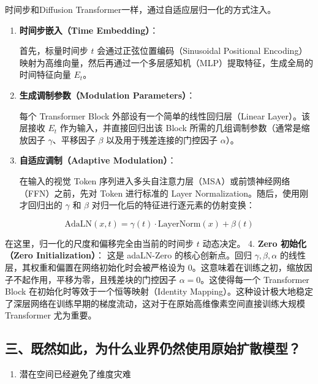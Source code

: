 时间步和Diffusion Transformer一样，通过自适应层归一化的方式注入。

\begin{enumerate}
\def\labelenumi{\arabic{enumi}.}
\item
  \textbf{时间步嵌入（Time Embedding）}：

  首先，标量时间步 \(t\) 会通过正弦位置编码（Sinusoidal Positional Encoding）映射为高维向量，然后再通过一个多层感知机（MLP）提取特征，生成全局的时间特征向量 \(E_t\)。
\item
  \textbf{生成调制参数（Modulation Parameters）}：

  每个 Transformer Block 外部设有一个简单的线性回归层（Linear Layer）。该层接收 \(E_t\) 作为输入，并直接回归出该 Block 所需的几组调制参数（通常是缩放因子 \(\gamma\)、平移因子 \(\beta\) 以及用于残差连接的门控因子 \(\alpha\)）。
\item
  \textbf{自适应调制（Adaptive Modulation）}：

  在输入的视觉 Token 序列进入多头自注意力层（MSA）或前馈神经网络（FFN）之前，先对 Token 进行标准的 Layer Normalization。随后，使用刚才回归出的 \(\gamma\) 和 \(\beta\) 对归一化后的特征进行逐元素的仿射变换：
\end{enumerate}

\[
\mathrm{AdaLN}(x,t)=\gamma(t)\cdot\mathrm{LayerNorm}(x)+\beta(t)
\]

在这里，归一化的尺度和偏移完全由当前的时间步 \(t\) 动态决定。
4. \textbf{Zero 初始化（Zero Initialization）}：
这是 adaLN-Zero 的核心创新点。回归 \(\gamma,\beta,\alpha\) 的线性层，其权重和偏置在网络初始化时会被严格设为 \(0\)。这意味着在训练之初，缩放因子不起作用，平移为零，且残差块的门控因子 \(\alpha=0\)。这使得每一个 Transformer Block 在初始化时等效于一个恒等映射（Identity Mapping）。这种设计极大地稳定了深层网络在训练早期的梯度流动，这对于在原始高维像素空间直接训练大规模 Transformer 尤为重要。

\hypertarget{ux4e09ux65e2ux7136ux5982ux6b64ux4e3aux4ec0ux4e48ux4e1aux754cux4ecdux7136ux4f7fux7528ux539fux59cbux6269ux6563ux6a21ux578b}{%
\subsection{三、既然如此，为什么业界仍然使用原始扩散模型？}\label{ux4e09ux65e2ux7136ux5982ux6b64ux4e3aux4ec0ux4e48ux4e1aux754cux4ecdux7136ux4f7fux7528ux539fux59cbux6269ux6563ux6a21ux578b}}

\begin{enumerate}
\def\labelenumi{\arabic{enumi}.}
\tightlist
\item
  潜在空间已经避免了维度灾难
\end{enumerate}

